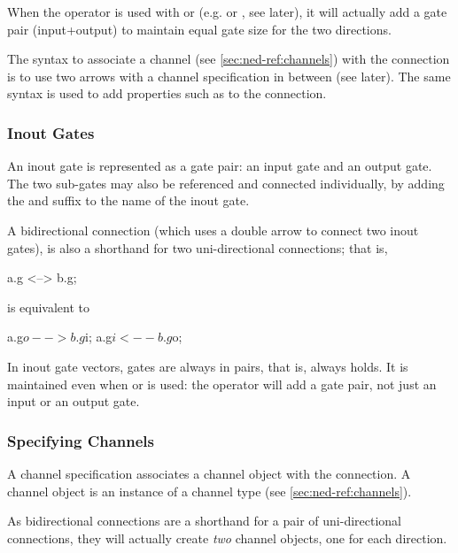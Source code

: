When the \ttt{++} operator is used with  or 
(e.g.  or , see later), it will actually add
a gate pair (input+output) to maintain equal gate size for the two
directions.

The syntax to associate a channel (see \ref{sec:ned-ref:channels})
with the connection is to use two arrows with a channel specification
in between (see later). The same syntax is used to add properties such as
 to the connection.




\subsubsection{Inout Gates}
\label{sec:ned-ref:inout-gates}

An inout gate is represented as a gate pair: an input gate and an output gate.
The two sub-gates may also be referenced and connected individually, by adding
the  and  suffix to the name of the inout gate.

A bidirectional connection (which uses a double arrow to connect two inout gates),
is also a shorthand for two uni-directional connections; that is,

\begin{ned}
a.g <--> b.g;
\end{ned}

is equivalent to
\begin{ned}
a.g$o --> b.g$i;
a.g$i <-- b.g$o;
\end{ned}

In inout gate vectors, gates are always in pairs, that is,
 always holds. It is maintained even
when  or  is used: the \ttt{++} operator will
add a gate pair, not just an input or an output gate.


\subsubsection{Specifying Channels}
\label{sec:ned-ref:specifying-channels}

A channel specification associates a channel object with the connection.
A channel object is an instance of a channel type (see \ref{sec:ned-ref:channels}).

\begin{note}
As bidirectional connections are a shorthand for a pair of uni-directional
connections, they will actually create \textit{two} channel objects, one
for each direction.
\end{note}

